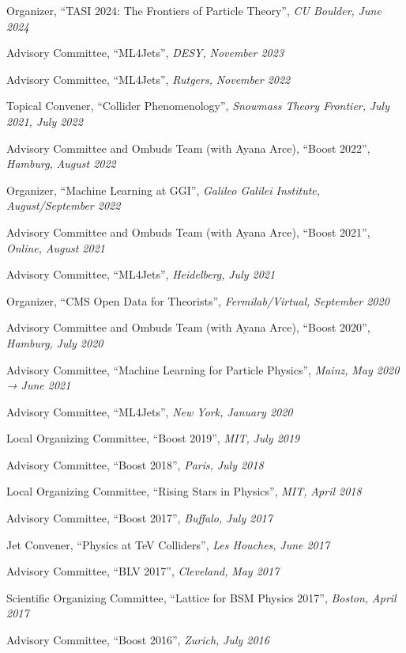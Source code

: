 \item Organizer, ``TASI 2024: The Frontiers of Particle Theory'', \emph{CU Boulder, }\emph{June 2024}
\item Advisory Committee, ``ML4Jets'', \emph{DESY, }\emph{November 2023}
\item Advisory Committee, ``ML4Jets'', \emph{Rutgers, }\emph{November 2022}
\item Topical Convener, ``Collider Phenomenology'', \emph{Snowmass Theory Frontier, }\emph{July 2021, July 2022}
\item Advisory Committee and Ombuds Team (with Ayana Arce), ``Boost 2022'', \emph{Hamburg, }\emph{August 2022}
\item Organizer, ``Machine Learning at GGI'', \emph{Galileo Galilei Institute, }\emph{August/September 2022}
\item Advisory Committee and Ombuds Team (with Ayana Arce), ``Boost 2021'', \emph{Online, }\emph{August 2021}
\item Advisory Committee, ``ML4Jets'', \emph{Heidelberg, }\emph{July 2021}
\item Organizer, ``CMS Open Data for Theorists'', \emph{Fermilab/Virtual, }\emph{September 2020}
\item Advisory Committee and Ombuds Team (with Ayana Arce), ``Boost 2020'', \emph{Hamburg, }\emph{July 2020}
\item Advisory Committee, ``Machine Learning for Particle Physics'', \emph{Mainz, }\emph{May 2020 → June 2021}
\item Advisory Committee, ``ML4Jets'', \emph{New York, }\emph{January 2020}
\item Local Organizing Committee, ``Boost 2019'', \emph{MIT, }\emph{July 2019}
\item Advisory Committee, ``Boost 2018'', \emph{Paris, }\emph{July 2018}
\item Local Organizing Committee, ``Rising Stars in Physics'', \emph{MIT, }\emph{April 2018}
\item Advisory Committee, ``Boost 2017'', \emph{Buffalo, }\emph{July 2017}
\item Jet Convener, ``Physics at TeV Colliders'', \emph{Les Houches, }\emph{June 2017}
\item Advisory Committee, ``BLV 2017'', \emph{Cleveland, }\emph{May 2017}
\item Scientific Organizing Committee, ``Lattice for BSM Physics 2017'', \emph{Boston, }\emph{April 2017}
\item Advisory Committee, ``Boost 2016'', \emph{Zurich, }\emph{July 2016}
